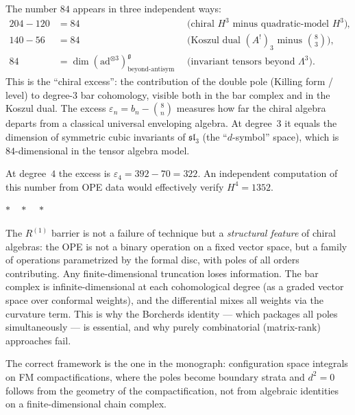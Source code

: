 \documentclass[11pt]{article}
\newcommand{\fg}{\mathfrak{g}}
\newcommand{\fsl}{\mathfrak{sl}}
\begin{document}
The number $84$ appears in three independent ways:
\begin{align*}
  204 - 120 &= 84 &
  &\text{(chiral $H^3$ minus quadratic-model $H^3$)}, \\
  140 - 56 &= 84 &
  &\text{(Koszul dual $(A^!)_3$ minus $\binom{8}{3}$)}, \\
  84 &= \dim(\mathrm{ad}^{\otimes 3})^{\fg}_{\text{beyond-antisym}}  &
  &\text{(invariant tensors beyond $\Lambda^3$)}.
\end{align*}
This is the ``chiral excess'': the contribution of the double pole
(Killing form / level) to degree-$3$ bar cohomology, visible both
in the bar complex and in the Koszul dual.  The excess
$\varepsilon_n = b_n - \binom{8}{n}$ measures how far the chiral
algebra departs from a classical universal enveloping algebra.
At degree~$3$ it equals the dimension of symmetric cubic invariants
of $\fsl_3$ (the ``$d$-symbol'' space), which is $84$-dimensional
in the tensor algebra model.

At degree~$4$ the excess is $\varepsilon_4 = 392 - 70 = 322$.
An independent computation of this number from OPE data would
effectively verify $H^4 = 1352$.

\bigskip
\begin{center}
$*\quad*\quad*$
\end{center}

\begin{remark}
The $R^{(1)}$ barrier is not a failure of technique but a
\emph{structural feature} of chiral algebras: the OPE is not a
binary operation on a fixed vector space, but a family of operations
parametrized by the formal disc, with poles of all orders contributing.
Any finite-dimensional truncation loses information.  The bar complex
is infinite-dimensional at each cohomological degree (as a graded
vector space over conformal weights), and the differential mixes
all weights via the curvature term.  This is why the Borcherds
identity --- which packages all poles simultaneously --- is essential,
and why purely combinatorial (matrix-rank) approaches fail.

The correct framework is the one in the monograph: configuration
space integrals on FM compactifications, where the poles become
boundary strata and $d^2 = 0$ follows from the geometry of the
compactification, not from algebraic identities on a
finite-dimensional chain complex.
\end{remark}


\end{document}
